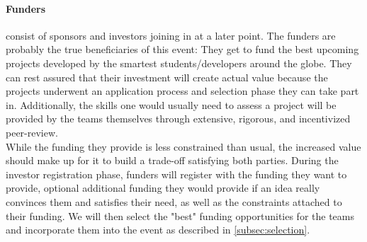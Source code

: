 \paragraph{Funders} consist of sponsors and investors joining in at a later point. The funders are probably the true beneficiaries of this event: They get to fund the best upcoming projects developed by the smartest students/developers around the globe. They can rest assured that their investment will create actual value because the projects underwent an application process and selection phase they can take part in. Additionally, the skills one would usually need to assess a project will be provided by the teams themselves through extensive, rigorous, and incentivized peer-review.\\
While the funding they provide is less constrained than usual, the increased value should make up for it to build a trade-off satisfying both parties. During the investor registration phase, funders will register with the funding they want to provide, optional additional funding they would provide if an idea really convinces them and satisfies their need, as well as the constraints attached to their funding. We will then select the "best" funding opportunities for the teams and incorporate them into the event as described in \autoref{subsec:selection}.
